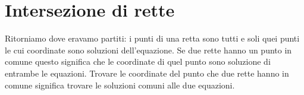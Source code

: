 % 

\section{Intersezione di rette}
\label{sec:retta_intersezionedirette}

Ritorniamo dove eravamo partiti: i punti di una retta sono tutti e soli quei 
punti le cui coordinate sono soluzioni dell'equazione. Se due rette hanno un 
punto in comune questo significa che le coordinate di quel punto sono 
soluzione di entrambe le equazioni. Trovare le coordinate del punto che due 
rette hanno in comune significa trovare le soluzioni comuni alle due equazioni.

